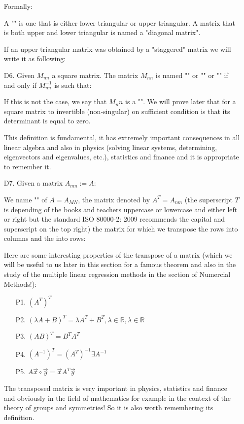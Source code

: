 \begin{enumerate}
		Formally:
		 
		A "" is one that is either lower triangular or upper triangular. A matrix that is both upper and lower triangular is named a "diagonal matrix".
		
		If an upper triangular matrix was obtained by a "staggered" matrix we will write it as following:
		
		
		\item[D6.] Given $M_{nn}$ a square matrix. The matrix $M_{nn}$ is named "" or "" or "" if and only if $M_{nn}^{-1}$ is such that:
		
		If this is not the case, we say that $M_nn$ is a "". We will prove later that for a square matrix to invertible (non-singular) on sufficient condition is that its determinant is equal to zero.
		
		This definition is fundamental, it has extremely important consequences in all linear algebra and also in physics (solving linear systems, determining, eigenvectors and eigenvalues, etc.), statistics and finance and it is appropriate to remember it.
		
		\item[D7.] Given a matrix $A_{mn}:=A$:
		
		We name "\label{transposed matrix}" of $A=A_ {MN}$, the matrix denoted by $A^T=A_{nm}$  (the superscript $T$ is depending of the books and teachers uppercase or lowercase and either left or right but the standard ISO 80000-2: 2009 recommends the capital and superscript on the top right) the matrix for which we transpose the rows into columns and the into rows:
		
		Here are some interesting properties of the transpose of a matrix (which we will be useful to us later in this section for a famous theorem and also in the study of the multiple linear regression methods in the section of Numercial Methods!):
		\begin{enumerate}
			\item[P1.] $(A^T)^T$
			\item[P2.] $(\lambda A+B)^T=\lambda A^T+B^T,\lambda\in \mathbb{R},\lambda\in \mathbb{R}$
			\item[P3.] $(AB)^T=B^TA^T$
			\item[P4.] $(A^{-1})^T=(A^T)^{-1}\exists A^{-1}$
			\item[P5.] $A\vec{x}\circ\vec{y}=\vec{x}A^T\vec{y}$
		\end{enumerate}
		The transposed matrix is very important in physics, statistics and finance and obviously in the field of mathematics for example in the context of the theory of groups and symmetries! So it is also worth remembering its definition.
		

\end{enumerate}
